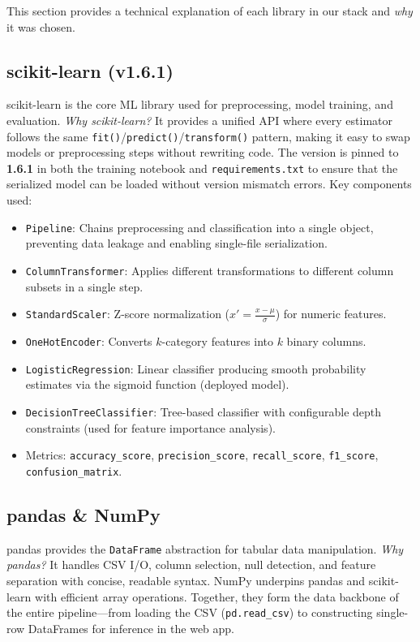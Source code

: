 \documentclass[12pt, a4paper]{article}
\begin{document}
This section provides a technical explanation of each library in our stack and \textit{why} it was chosen.

\subsection{scikit-learn (v1.6.1)}

scikit-learn is the core ML library used for preprocessing, model training, and evaluation. \textit{Why scikit-learn?} It provides a unified API where every estimator follows the same \texttt{fit()}/\texttt{predict()}/\texttt{transform()} pattern, making it easy to swap models or preprocessing steps without rewriting code. The version is pinned to \textbf{1.6.1} in both the training notebook and \texttt{requirements.txt} to ensure that the serialized model can be loaded without version mismatch errors. Key components used:

\begin{itemize}
    \item \texttt{Pipeline}: Chains preprocessing and classification into a single object, preventing data leakage and enabling single-file serialization.
    \item \texttt{ColumnTransformer}: Applies different transformations to different column subsets in a single step.
    \item \texttt{StandardScaler}: Z-score normalization ($x' = \frac{x - \mu}{\sigma}$) for numeric features.
    \item \texttt{OneHotEncoder}: Converts $k$-category features into $k$ binary columns.
    \item \texttt{LogisticRegression}: Linear classifier producing smooth probability estimates via the sigmoid function (deployed model).
    \item \texttt{DecisionTreeClassifier}: Tree-based classifier with configurable depth constraints (used for feature importance analysis).
    \item Metrics: \texttt{accuracy\_score}, \texttt{precision\_score}, \texttt{recall\_score}, \texttt{f1\_score}, \texttt{confusion\_matrix}.
\end{itemize}

\subsection{pandas \& NumPy}

pandas provides the \texttt{DataFrame} abstraction for tabular data manipulation. \textit{Why pandas?} It handles CSV I/O, column selection, null detection, and feature separation with concise, readable syntax. NumPy underpins pandas and scikit-learn with efficient array operations. Together, they form the data backbone of the entire pipeline---from loading the CSV (\texttt{pd.read\_csv}) to constructing single-row DataFrames for inference in the web app.
\end{document}
